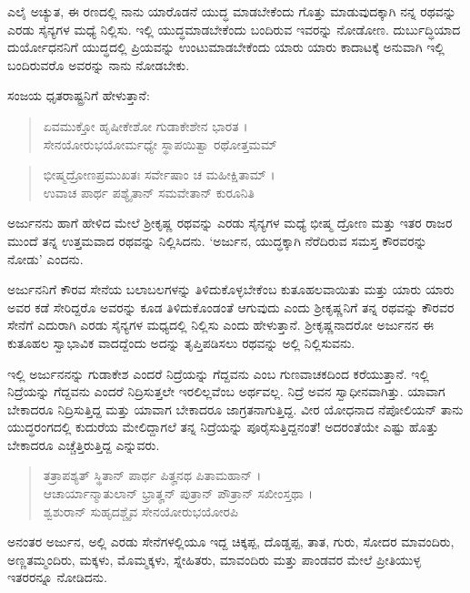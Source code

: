 {\small ಎಲೈ ಅಚ್ಯುತ, ಈ ರಣದಲ್ಲಿ ನಾನು ಯಾರೊಡನೆ ಯುದ್ಧ ಮಾಡಬೇಕೆಂದು ಗೊತ್ತು ಮಾಡುವುದಕ್ಕಾಗಿ ನನ್ನ ರಥವನ್ನು ಎರಡು ಸೈನ್ಯಗಳ ಮಧ್ಯೆ ನಿಲ್ಲಿಸು. ಇಲ್ಲಿ ಯುದ್ಧಮಾಡಬೇಕೆಂದು ಬಂದಿರುವ ಇವರನ್ನು ನೋಡೋಣ. ದುರ್ಬುದ್ಧಿಯಾದ ದುರ್ಯೋಧನನಿಗೆ ಯುದ್ಧದಲ್ಲಿ ಪ್ರಿಯವನ್ನು ಉಂಟುಮಾಡಬೇಕೆಂದು ಯಾರು ಯಾರು ಕಾದಾಟಕ್ಕೆ ಅನುವಾಗಿ ಇಲ್ಲಿ ಬಂದಿರುವರೊ ಅವರನ್ನು ನಾನು ನೋಡಬೇಕು.}

ಸಂಜಯ ಧೃತರಾಷ್ಟ್ರನಿಗೆ ಹೇಳುತ್ತಾನೆ:

\begin{verse}
ಏವಮುಕ್ತೋ ಹೃಷೀಕೇಶೋ ಗುಡಾಕೇಶೇನ ಭಾರತ ।\\ಸೇನಯೋರುಭಯೋರ್ಮಧ್ಯೇ ಸ್ಥಾಪಯಿತ್ವಾ ರಥೋತ್ತಮಮ್ 
\end{verse}

\begin{verse}
ಭೀಷ್ಮದ್ರೋಣಪ್ರಮುಖತಃ ಸರ್ವೇಷಾಂ ಚ ಮಹೀಕ್ಷಿತಾಮ್ ।\\ಉವಾಚ ಪಾರ್ಥ ಪಶ್ಯೈತಾನ್ ಸಮವೇತಾನ್ ಕುರೂನಿತಿ 
\end{verse}

{\small ಅರ್ಜುನನು ಹಾಗೆ ಹೇಳಿದ ಮೇಲೆ ಶ್ರೀಕೃಷ್ಣ ರಥವನ್ನು ಎರಡು ಸೈನ್ಯಗಳ ಮಧ್ಯೆ ಭೀಷ್ಮ ದ್ರೋಣ ಮತ್ತು ಇತರ ರಾಜರ ಮುಂದೆ ತನ್ನ ಉತ್ತಮವಾದ ರಥವನ್ನು ನಿಲ್ಲಿಸಿದನು. ‘ಅರ್ಜುನ, ಯುದ್ಧಕ್ಕಾಗಿ ನೆರೆದಿರುವ ಸಮಸ್ತ ಕೌರವರನ್ನು ನೋಡು’ ಎಂದನು.}

ಅರ್ಜುನನಿಗೆ ಕೌರವ ಸೇನೆಯ ಬಲಾಬಲಗಳನ್ನು ತಿಳಿದುಕೊಳ್ಳಬೇಕೆಂಬ ಕುತೂಹಲವಾಯಿತು ಮತ್ತು ಯಾರು ಯಾರು ಅವರ ಕಡೆ ಸೇರಿದ್ದರೊ ಅವರನ್ನು ಕೂಡ ತಿಳಿದುಕೊಂಡಂತೆ ಆಗುವುದು ಎಂದು ಶ್ರೀಕೃಷ್ಣನಿಗೆ ತನ್ನ ರಥವನ್ನು ಕೌರವರ ಸೇನೆಗೆ ಎದುರಾಗಿ ಎರಡು ಸೈನ್ಯಗಳ ಮಧ್ಯದಲ್ಲಿ ನಿಲ್ಲಿಸು ಎಂದು ಹೇಳುತ್ತಾನೆ. ಶ್ರೀಕೃಷ್ಣನಾದರೋ ಅರ್ಜುನನ ಈ ಕುತೂಹಲ ಸ್ವಾಭಾವಿಕ ವಾದದ್ದೆಂದು ಅದನ್ನು ತೃಪ್ತಿಪಡಿಸಲು ರಥವನ್ನು ಅಲ್ಲಿ ನಿಲ್ಲಿಸುವನು.

ಇಲ್ಲಿ ಅರ್ಜುನನನ್ನು ಗುಡಾಕೇಶ ಎಂದರೆ ನಿದ್ರೆಯನ್ನು ಗೆದ್ದವನು ಎಂಬ ಗುಣವಾಚಕದಿಂದ ಕರೆಯುತ್ತಾನೆ. ಇಲ್ಲಿ ನಿದ್ರೆಯನ್ನು ಗೆದ್ದವನು ಎಂದರೆ ನಿದ್ರಿಸುತ್ತಲೇ ಇರಲಿಲ್ಲವೆಂಬ ಅರ್ಥವಲ್ಲ. ನಿದ್ರೆ ಅವನ ಸ್ವಾಧೀನವಾಗಿತ್ತು. ಯಾವಾಗ ಬೇಕಾದರೂ ನಿದ್ರಿಸುತ್ತಿದ್ದ ಮತ್ತು ಯಾವಾಗ ಬೇಕಾದರೂ ಜಾಗ್ರತನಾಗುತ್ತಿದ್ದ. ವೀರ ಯೋಧನಾದ ನೆಪೋಲಿಯನ್ ತಾನು ಯುದ್ಧರಂಗದಲ್ಲಿ ಕುದುರೆಯ ಮೇಲಿದ್ದಾಗಲೆ ತನ್ನ ನಿದ್ರೆಯನ್ನು ಪೂರೈಸುತ್ತಿದ್ದನಂತೆ! ಅದರಂತೆಯೇ ಎಷ್ಟು ಹೊತ್ತು ಬೇಕಾದರೂ ಎಚ್ಚೆತ್ತಿರುತ್ತಿದ್ದ ಎನ್ನುವರು.

\begin{verse}
ತತ್ರಾಪಶ್ಯತ್ ಸ್ಥಿತಾನ್ ಪಾರ್ಥ ಪಿತೄನಥ ಪಿತಾಮಹಾನ್ ।\\ಆಚಾರ್ಯಾನ್ಮಾತುಲಾನ್ ಭ್ರಾತೄನ್ ಪುತ್ರಾನ್ ಪೌತ್ರಾನ್ ಸಖೀಂಸ್ತಥಾ ।\\ಶ್ವಶುರಾನ್ ಸುಹೃದಶ್ಚೈವ ಸೇನಯೋರುಭಯೋರಪಿ 
\end{verse}

{\small ಅನಂತರ ಅರ್ಜುನ, ಅಲ್ಲಿ ಎರಡು ಸೇನೆಗಳಲ್ಲಿಯೂ ಇದ್ದ ಚಿಕ್ಕಪ್ಪ, ದೊಡ್ಡಪ್ಪ, ತಾತ, ಗುರು, ಸೋದರ ಮಾವಂದಿರು, ಅಣ್ಣತಮ್ಮಂದಿರು, ಮಕ್ಕಳು, ಮೊಮ್ಮಕ್ಕಳು, ಸ್ನೇಹಿತರು, ಮಾವಂದಿರು ಮತ್ತು ಪಾಂಡವರ ಮೇಲೆ ಪ್ರೀತಿಯುಳ್ಳ ಇತರರನ್ನೂ ನೋಡಿದನು.}

